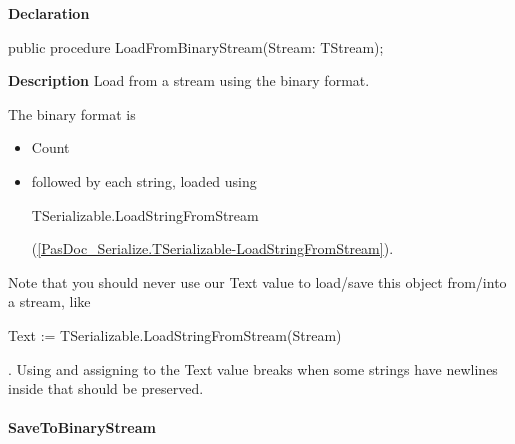 \documentclass{report}
\newif\ifpdf
\begin{document}
\label{PasDoc_StringVector.TStringVector-LoadFromBinaryStream}
\begin{list}{}{
\setlength{\itemindent}{0cm}
\setlength{\listparindent}{0cm}
\setlength{\leftmargin}{\evensidemargin}
\addtolength{\leftmargin}{\tmplength}
\settowidth{\labelsep}{X}
\addtolength{\leftmargin}{\labelsep}
\setlength{\labelwidth}{\tmplength}
}
\item[\textbf{Declaration}\hfill]
\ifpdf
\begin{flushleft}
\fi
\begin{ttfamily}
public procedure LoadFromBinaryStream(Stream: TStream);\end{ttfamily}

\ifpdf
\end{flushleft}
\fi

\par
\item[\textbf{Description}]
Load from a stream using the binary format.

The binary format is \begin{itemize}
\item Count
\item followed by each string, loaded using \begin{ttfamily}TSerializable.LoadStringFromStream\end{ttfamily}(\ref{PasDoc_Serialize.TSerializable-LoadStringFromStream}).
\end{itemize}

Note that you should never use our Text value to load/save this object from/into a stream, like \begin{ttfamily}Text := TSerializable.LoadStringFromStream(Stream)\end{ttfamily}. Using and assigning to the Text value breaks when some strings have newlines inside that should be preserved.

\end{list}
\paragraph*{SaveToBinaryStream}\hspace*{\fill}
\end{document}

